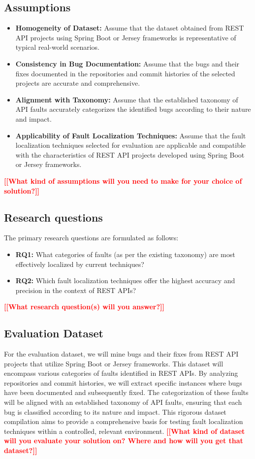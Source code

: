 \documentclass[conference]{IEEEtran}
\newcommand{\todo}[1]{\textcolor{red}{{\bfseries [[#1]]}}}
\begin{document}
\subsection{Assumptions}
\begin{itemize}
    \item \textbf{Homogeneity of Dataset:} Assume that the dataset obtained from REST API projects using Spring Boot or Jersey frameworks is representative of typical real-world scenarios.
    
    \item \textbf{Consistency in Bug Documentation:} Assume that the bugs and their fixes documented in the repositories and commit histories of the selected projects are accurate and comprehensive.
    
    \item \textbf{Alignment with Taxonomy:} Assume that the established taxonomy of API faults accurately categorizes the identified bugs according to their nature and impact.
        
    \item \textbf{Applicability of Fault Localization Techniques:} Assume that the fault localization techniques selected for evaluation are applicable and compatible with the characteristics of REST API projects developed using Spring Boot or Jersey frameworks.
\end{itemize}
    \todo{What kind of assumptions will you need to make for your choice of solution?}

\subsection{Research questions}
    The primary research questions are formulated as follows:
    \begin{itemize}
        \item \textbf{RQ1:} What categories of faults (as per the existing taxonomy) are most effectively localized by current techniques?
        \item \textbf{RQ2:} Which fault localization techniques offer the highest accuracy and precision in the context of REST APIs?
    \end{itemize}
    \todo{What research question(s) will you answer?}

\subsection{Evaluation Dataset}
For the evaluation dataset, we will mine bugs and their fixes from REST API projects that utilize Spring Boot or Jersey frameworks. This dataset will encompass various categories of faults identified in REST APIs. By analyzing repositories and commit histories, we will extract specific instances where bugs have been documented and subsequently fixed. The categorization of these faults will be aligned with an established taxonomy of API faults, ensuring that each bug is classified according to its nature and impact. This rigorous dataset compilation aims to provide a comprehensive basis for testing fault localization techniques within a controlled, relevant environment.
    \todo{What kind of dataset will you evaluate your solution on? Where and how will you get that dataset?}
\end{document}
